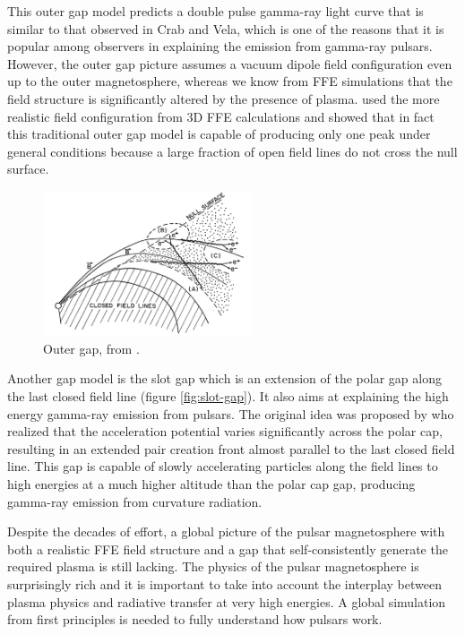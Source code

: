 This outer gap model predicts a double pulse gamma-ray light curve that is
similar to that observed in Crab and Vela, which is one of the reasons that it
is popular among observers in explaining the emission from gamma-ray pulsars.
However, the outer gap picture assumes a vacuum dipole field configuration even
up to the outer magnetosphere, whereas we know from FFE simulations that the
field structure is significantly altered by the presence of plasma.
\citet{bai_modeling_2010} used the more realistic field configuration from 3D
FFE calculations and showed that in fact this traditional outer gap model is
capable of producing only one peak under general conditions because a large
fraction of open field lines do not cross the null surface.

\begin{figure}[h]
  \centering
  \includegraphics[width=0.55\textwidth]{pics/intro/outer-gap.png}
  \caption[Outer gap]{Outer gap, from \citet{cheng_energetic_1986}.}
  \label{fig:outer-gap}
\end{figure}

Another gap model is the slot gap which is an extension of the polar gap along
the last closed field line (figure \ref{fig:slot-gap}). It also aims at
explaining the high energy gamma-ray emission from pulsars. The original idea
was proposed by \citet{arons_pair_1979} who realized that the acceleration
potential varies significantly across the polar cap, resulting in an extended
pair creation front almost parallel to the last closed field line. This gap is
capable of slowly accelerating particles along the field lines to high energies
at a much higher altitude than the polar cap gap, producing gamma-ray emission
from curvature radiation.

Despite the decades of effort, a global picture of the pulsar magnetosphere with
both a realistic FFE field structure and a gap that self-consistently generate
the required plasma is still lacking. The physics of the pulsar magnetosphere
is surprisingly rich and it is important to take into account the interplay
between plasma physics and radiative transfer at very high energies. A global
simulation from first principles is needed to fully understand how pulsars work.

